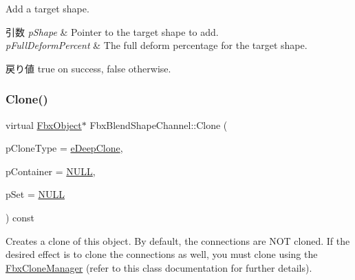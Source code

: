 Add a target shape. 
\begin{DoxyParams}{引数}
{\em p\+Shape} & Pointer to the target shape to add. \\
\hline
{\em p\+Full\+Deform\+Percent} & The full deform percentage for the target shape. \\
\hline
\end{DoxyParams}
\begin{DoxyReturn}{戻り値}
{\ttfamily true} on success, {\ttfamily false} otherwise. 
\end{DoxyReturn}
\mbox{\label{class_fbx_blend_shape_channel_a37993d2cccb4376edb241577ccbd061f}} 
\subsubsection{\texorpdfstring{Clone()}{Clone()}}
{\footnotesize\ttfamily virtual \hyperlink{class_fbx_object}{Fbx\+Object}$\ast$ Fbx\+Blend\+Shape\+Channel\+::\+Clone (\begin{DoxyParamCaption}\item[{\hyperlink{class_fbx_object_a9f5626b2d2135684d6ea1e6e4ad2acbb}{Fbx\+Object\+::\+E\+Clone\+Type}}]{p\+Clone\+Type = {\ttfamily \hyperlink{class_fbx_object_a9f5626b2d2135684d6ea1e6e4ad2acbbaacdf137ca059c572798287e98c4236d0}{e\+Deep\+Clone}},  }\item[{\hyperlink{class_fbx_object}{Fbx\+Object} $\ast$}]{p\+Container = {\ttfamily \hyperlink{fbxarch_8h_a070d2ce7b6bb7e5c05602aa8c308d0c4}{N\+U\+LL}},  }\item[{void $\ast$}]{p\+Set = {\ttfamily \hyperlink{fbxarch_8h_a070d2ce7b6bb7e5c05602aa8c308d0c4}{N\+U\+LL}} }\end{DoxyParamCaption}) const\hspace{0.3cm}{\ttfamily [virtual]}}

Creates a clone of this object. By default, the connections are N\+OT cloned. If the desired effect is to clone the connections as well, you must clone using the \hyperlink{class_fbx_clone_manager}{Fbx\+Clone\+Manager} (refer to this class documentation for further details).


